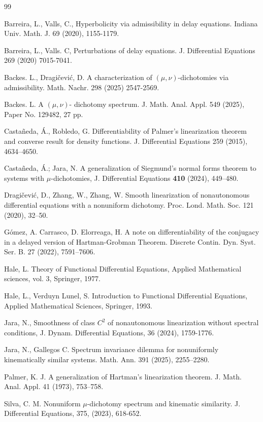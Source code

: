 \documentclass[9pt]{amsart}
\numberwithin{equation}{section}
\numberwithin{lemma}{section}
\begin{document}
\begin{thebibliography}{99}


Barreira, L., Valls, C., Hyperbolicity via admissibility in delay equations. Indiana Univ. Math. J. 69 (2020), 1155-1179.

 Barreira, L., Valls. C, Perturbations of delay equations. J. Differential Equations  269  (2020) 7015-7041.

 Backes. L., Dragi\v{c}evi\'c, D. A characterization of $(\mu,\nu)$-dichotomies via admissibility. Math. Nachr. 298 (2025) 2547-2569.

 Backes. L. A $(\mu,\nu)$-  dichotomy spectrum. J. Math. Anal. Appl. 549 (2025), Paper No. 129482, 27 pp.

Casta\~{n}eda, \'A., Robledo, G. Differentiability of Palmer's linearization theorem and converse result for density functions. J. Differential Equations 259 (2015), 4634–4650.

 Casta\~neda, \'A.; Jara, N. A generalization of Siegmund's normal forms theorem to systems with $\mu$-dichotomies, J. Differential Equations {\bf 410} (2024), 449--480.

Dragi\v{c}evi\'c, D., Zhang, W., Zhang, W.
Smooth linearization of nonautonomous differential equations with a nonuniform dichotomy. Proc. Lond. Math. Soc. 121 (2020), 32--50.

G\'omez, A. Carrasco, D.  Elorreaga, H.
A note on differentiability of the conjugacy in a delayed
              version of Hartman-Grobman Theorem.
Discrete Contin. Dyn. Syst. Ser. B. 27 (2022), 7591--7606.
      

 Hale, L. Theory of Functional Differential Equations, Applied Mathematical sciences, vol. 3, Springer, 1977.

 Hale, L., Verduyn Lunel, S. Introduction to Functional Differential Equations, Applied Mathematical Sciences, Springer, 1993.

 Jara, N., Smoothness of class $C^2$ of nonautonomous linearization without spectral conditions, J. Dynam. Differential Equations, 36 (2024), 1759-1776.

 Jara, N., Gallegos C. Spectrum invariance dilemma for nonuniformly kinematically similar systems. Math. Ann. 391 (2025), 2255--2280.

Palmer, K. J. A generalization of Hartman's linearization theorem. J. Math. Anal. Appl. 41 (1973), 753–758.

Silva, C. M. Nonuniform $\mu$-dichotomy spectrum and kinematic similarity. J. Differential Equations, 375, (2023), 618-652.




\end{thebibliography}
\end{document}
